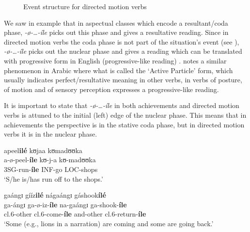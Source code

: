 \documentclass[output=paper,newtxmath,modfonts,nonflat,draftmode]{langsci/langscibook}
\begin{document}
\begin{figure}
\caption{Event structure for directed motion verbs\label{fig:kanijo:10}}
\end{figure}

We saw in example  that in aspectual classes which encode a resultant/coda phase, \textit{-ø}\textit{-…-íle} picks out this phase and gives a resultative reading. Since in directed motion verbs the coda phase is not part of the situation’s event (see ), \textit{-ø}\textit{-…-íle} picks out the nuclear phase and gives a reading which can be translated with progressive form in English (progressive-like reading) . \citet[194]{Ebert1995} notes a similar phenomenon in Arabic where what is called the ‘Active Particle’ form, which usually indicates perfect/resultative meaning in other verbs, in verbs of posture, of motion and of sensory perception expresses a progressive-like reading.

It is important to state that \textit{-ø}\textit{-…-íle} in both achievements and directed motion verbs is attuned to the initial (left) edge of the nuclear phase. This means that in achievements the perspective is in the stative coda phase, but in directed motion verbs it is in the nuclear phase.

\ea \label{ex:kanijo:21}
\ea
\glll apeel\textbf{ilé}  kʊjaa kʊmadʊʊka\\
 a-ø-peel-\textbf{íle} kʊ-j-a kʊ-madʊʊka\\
   3SG-run-\textbf{íle} INF-go LOC-shops\\
 \glt ‘S/he is/has run off to the shops.’

\ex 
\glll  gaángɪ     gííz\textbf{ilé}  nágaángɪ  gáshook\textbf{ílé}\\
 ga-ángɪ     ga-ø-iz-\textbf{íle}      na-gaángɪ  ga-shook-\textbf{íle}\\
 cl.6-other  cl.6-come-\textbf{íle} and-other   cl.6-return-\textbf{íle}\\
\glt ‘Some (e.g., lions in a narration) are coming and some are going back.’
\z
\z
\end{document}
